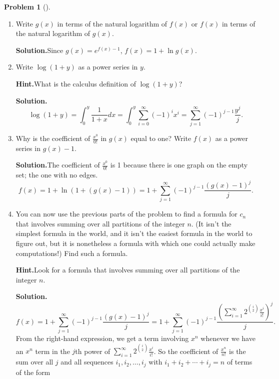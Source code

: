 \documentclass[10pt,]{book}
\theoremstyle{plain}
\theoremstyle{definition}
\newtheorem{activity}[project]{Problem}
\theoremstyle{definition}
\numberwithin{equation}{chapter}
\begin{document}
\begin{activity}[]
\begin{enumerate}[font=\bfseries,label=(\alph*),ref=\alph*]
\item\label{task-266} Write \(g(x)\) in terms of the natural logarithm of \(f(x)\) or \(f(x)\) in terms of the natural logarithm of  \(g(x)\).%
\par\medskip\noindent%
\textbf{Solution.}\quad Since \(g(x) = e^{f(x)-1}\), \(f(x) = 1+ \ln g(x)\).%
\item\label{task-267} Write \(\log(1+y)\) as a power series in \(y\).%
\par\medskip\noindent%
\textbf{Hint.}\quad What is the calculus definition of \(\log(1+y)\)?%
\par\medskip\noindent%
\textbf{Solution.}\quad %
\begin{equation*}
\log(1+y)=\int_0^y \frac{1}{1+x}dx =\int_0^y \sum_{i=0}^\infty
(-1)^ix^i = \sum_{j=1}^\infty (-1)^{j-1}\frac{y^j}{j}.
\end{equation*}
%
\item\label{task-268} Why is the coefficient of \(\frac{x^0}{0!}\) in \(g(x)\) equal to one?  Write \(f(x)\) as a power series in \(g(x) -1\).%
\par\medskip\noindent%
\textbf{Solution.}\quad The coefficient of \(\frac{x^0}{0!}\) is 1 because there is one graph on the empty set; the one with no edges.%
\begin{equation*}
f(x) = 1 +\ln(1 +
(g(x)-1))=1+\sum_{j=1}^\infty (-1)^{j-1}\frac{(g(x)-1)^j}{j}.
\end{equation*}
%
\item\label{task-269} You can now use the previous parts of the problem to find a formula for \(c_n\) that involves summing over all partitions of the integer \(n\). (It isn't the simplest formula in the world, and it isn't the easiest formula in the world to figure out, but it is nonetheless a formula with which one could actually make computations!)  Find such a  formula.%
\par\medskip\noindent%
\textbf{Hint.}\quad Look for a formula that involves summing over all partitions of the integer \(n\).%
\par\medskip\noindent%
\textbf{Solution.}\quad %
\begin{equation*}
f(x) = 1+\sum_{j=1}^\infty
(-1)^{j-1}\frac{(g(x)-1)^j}{j}= 1+\sum_{j=1}^\infty
(-1)^{j-1}\frac{(\sum_{i=1}^\infty 2^{\binom{i}{2}}\frac{x^i}{i!})^j}{j}.
\end{equation*}
From the right-hand expression, we get a term involving \(x^n\) whenever we have an \(x^n\) term in the \(j\)th power of \(\sum_{i=1}^\infty 2^{\binom{i}{2}}\frac{x^i}{i!}\). So the coefficient of \(\frac{x^n}{n!}\) is the sum over all \(j\) and all sequences \(i_1,i_2,\ldots,i_j\) with \(i_1+i_2+\cdots+i_j = n\) of terms of the form%

\end{enumerate}
\end{activity}
\end{document}

